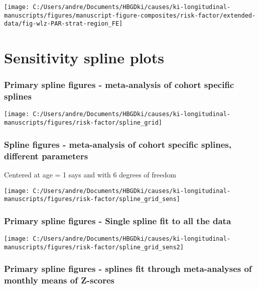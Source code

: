 \documentclass[
  9pt,
]{book}
\begin{document}
\texttt{[image: C:/Users/andre/Documents/HBGDki/causes/ki-longitudinal-manuscripts/figures/manuscript-figure-composites/risk-factor/extended-data/fig-wlz-PAR-strat-region\_FE]}

\hypertarget{sens_splines}{%
\chapter{Sensitivity spline plots}\label{sens_splines}}

\raggedright

\hypertarget{primary-spline-figures---meta-analysis-of-cohort-specific-splines}{%
\subsection{Primary spline figures - meta-analysis of cohort specific splines}\label{primary-spline-figures---meta-analysis-of-cohort-specific-splines}}

\texttt{[image: C:/Users/andre/Documents/HBGDki/causes/ki-longitudinal-manuscripts/figures/risk-factor/spline\_grid]}

\hypertarget{spline-figures---meta-analysis-of-cohort-specific-splines-different-parameters}{%
\subsection{Spline figures - meta-analysis of cohort specific splines, different parameters}\label{spline-figures---meta-analysis-of-cohort-specific-splines-different-parameters}}

Centered at age = 1 says and with 6 degrees of freedom

\texttt{[image: C:/Users/andre/Documents/HBGDki/causes/ki-longitudinal-manuscripts/figures/risk-factor/spline\_grid\_sens]}

\hypertarget{primary-spline-figures---single-spline-fit-to-all-the-data}{%
\subsection{Primary spline figures - Single spline fit to all the data}\label{primary-spline-figures---single-spline-fit-to-all-the-data}}

\texttt{[image: C:/Users/andre/Documents/HBGDki/causes/ki-longitudinal-manuscripts/figures/risk-factor/spline\_grid\_sens2]}

\hypertarget{primary-spline-figures---splines-fit-through-meta-analyses-of-monthly-means-of-z-scores}{%
\subsection{Primary spline figures - splines fit through meta-analyses of monthly means of Z-scores}\label{primary-spline-figures---splines-fit-through-meta-analyses-of-monthly-means-of-z-scores}}
\end{document}

